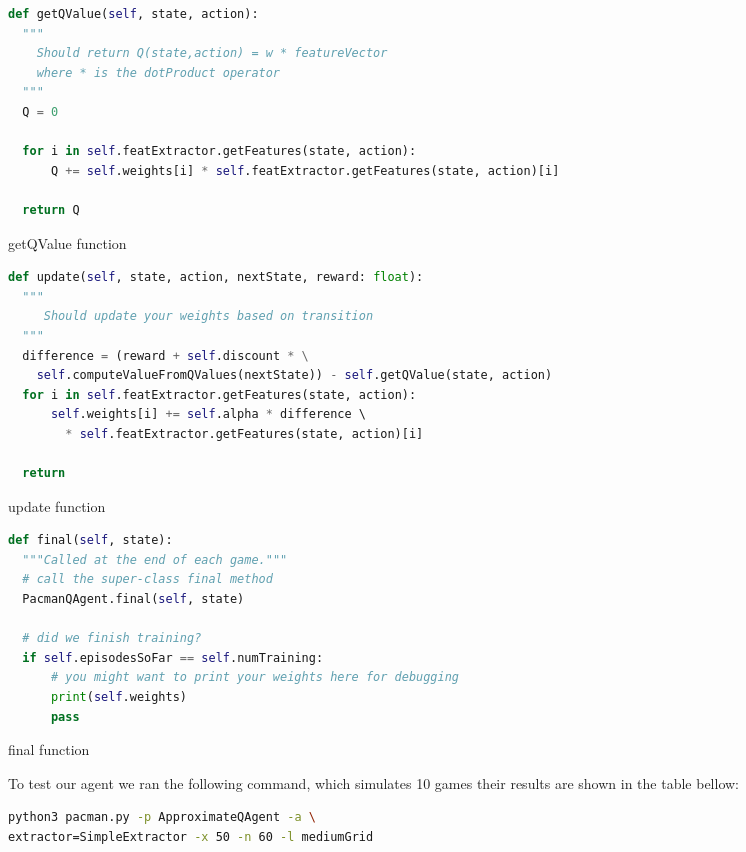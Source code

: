 \documentclass{article}
\begin{document}
\begin{table} [ht!]
  \begin{lstlisting}[language=python, frame=tlbr, framesep=6pt, backgroundcolor=\color{light-gray}]
  def getQValue(self, state, action):
  """
    Should return Q(state,action) = w * featureVector
    where * is the dotProduct operator
  """
  Q = 0

  for i in self.featExtractor.getFeatures(state, action):
      Q += self.weights[i] * self.featExtractor.getFeatures(state, action)[i]
  
  return Q
  \end{lstlisting}
  \caption{getQValue function}
\end{table}

\begin{table} [ht!]
  \begin{lstlisting}[language=python, frame=tlbr, framesep=6pt, backgroundcolor=\color{light-gray}]
  def update(self, state, action, nextState, reward: float):
  """
     Should update your weights based on transition
  """
  difference = (reward + self.discount * \
    self.computeValueFromQValues(nextState)) - self.getQValue(state, action)
  for i in self.featExtractor.getFeatures(state, action):
      self.weights[i] += self.alpha * difference \ 
        * self.featExtractor.getFeatures(state, action)[i]

  return
  \end{lstlisting}
  \caption{update function}
\end{table}

\begin{table} [ht!]
  \begin{lstlisting}[language=python, frame=tlbr, framesep=6pt, backgroundcolor=\color{light-gray}]
  def final(self, state):
  """Called at the end of each game."""
  # call the super-class final method
  PacmanQAgent.final(self, state)

  # did we finish training?
  if self.episodesSoFar == self.numTraining:
      # you might want to print your weights here for debugging
      print(self.weights)
      pass
  \end{lstlisting}
  \caption{final function}
\end{table}

To test our agent we ran the following command, which simulates 10 games their results are shown in the table bellow:

\definecolor{light-gray}{gray}{0.95}
\begin{lstlisting}[language=bash, frame=tlbr, framesep=6pt, backgroundcolor=\color{light-gray}]
python3 pacman.py -p ApproximateQAgent -a \
extractor=SimpleExtractor -x 50 -n 60 -l mediumGrid
\end{lstlisting}
\end{document}
